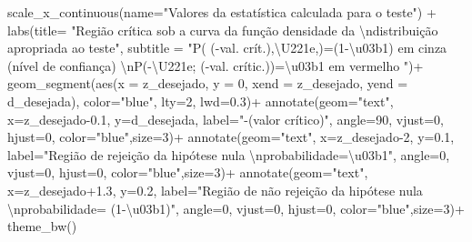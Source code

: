 \documentclass[
]{book}
\newenvironment{Shaded}{\begin{snugshade}}{\end{snugshade}}
\newcommand{\AttributeTok}[1]{\textcolor[rgb]{0.77,0.63,0.00}{#1}}
\newcommand{\DecValTok}[1]{\textcolor[rgb]{0.00,0.00,0.81}{#1}}
\newcommand{\FloatTok}[1]{\textcolor[rgb]{0.00,0.00,0.81}{#1}}
\newcommand{\FunctionTok}[1]{\textcolor[rgb]{0.00,0.00,0.00}{#1}}
\newcommand{\NormalTok}[1]{#1}
\newcommand{\SpecialCharTok}[1]{\textcolor[rgb]{0.00,0.00,0.00}{#1}}
\newcommand{\StringTok}[1]{\textcolor[rgb]{0.31,0.60,0.02}{#1}}
\begin{document}
\begin{Shaded}
\begin{Highlighting}[]
  \FunctionTok{scale\_x\_continuous}\NormalTok{(}\AttributeTok{name=}\StringTok{"Valores da estatística calculada para o teste"}\NormalTok{)  }\SpecialCharTok{+}
  \FunctionTok{labs}\NormalTok{(}\AttributeTok{title=} 
         \StringTok{"Região crítica sob a curva da função densidade da }\SpecialCharTok{\textbackslash{}n}\StringTok{distribuição apropriada ao teste"}\NormalTok{, }
       \AttributeTok{subtitle =} \StringTok{"P( ({-}val. crít.),\textbackslash{}U221e,)=(1{-}\textbackslash{}u03b1) em cinza (nível de confiança) }\SpecialCharTok{\textbackslash{}n}\StringTok{P({-}\textbackslash{}U221e; ({-}val. crític.))=\textbackslash{}u03b1 em vermelho "}\NormalTok{)}\SpecialCharTok{+}
\FunctionTok{geom\_segment}\NormalTok{(}\FunctionTok{aes}\NormalTok{(}\AttributeTok{x =}\NormalTok{ z\_desejado, }\AttributeTok{y =} \DecValTok{0}\NormalTok{, }\AttributeTok{xend =}\NormalTok{ z\_desejado, }\AttributeTok{yend =}\NormalTok{ d\_desejada), }\AttributeTok{color=}\StringTok{"blue"}\NormalTok{, }\AttributeTok{lty=}\DecValTok{2}\NormalTok{, }\AttributeTok{lwd=}\FloatTok{0.3}\NormalTok{)}\SpecialCharTok{+}
\FunctionTok{annotate}\NormalTok{(}\AttributeTok{geom=}\StringTok{"text"}\NormalTok{, }\AttributeTok{x=}\NormalTok{z\_desejado}\FloatTok{{-}0.1}\NormalTok{, }\AttributeTok{y=}\NormalTok{d\_desejada, }\AttributeTok{label=}\StringTok{"{-}(valor crítico)"}\NormalTok{, }\AttributeTok{angle=}\DecValTok{90}\NormalTok{, }\AttributeTok{vjust=}\DecValTok{0}\NormalTok{, }\AttributeTok{hjust=}\DecValTok{0}\NormalTok{, }\AttributeTok{color=}\StringTok{"blue"}\NormalTok{,}\AttributeTok{size=}\DecValTok{3}\NormalTok{)}\SpecialCharTok{+}
\FunctionTok{annotate}\NormalTok{(}\AttributeTok{geom=}\StringTok{"text"}\NormalTok{, }\AttributeTok{x=}\NormalTok{z\_desejado}\DecValTok{{-}2}\NormalTok{, }\AttributeTok{y=}\FloatTok{0.1}\NormalTok{, }\AttributeTok{label=}\StringTok{"Região de rejeição da hipótese nula }\SpecialCharTok{\textbackslash{}n}\StringTok{probabilidade=\textbackslash{}u03b1"}\NormalTok{, }\AttributeTok{angle=}\DecValTok{0}\NormalTok{, }\AttributeTok{vjust=}\DecValTok{0}\NormalTok{, }\AttributeTok{hjust=}\DecValTok{0}\NormalTok{, }\AttributeTok{color=}\StringTok{"blue"}\NormalTok{,}\AttributeTok{size=}\DecValTok{3}\NormalTok{)}\SpecialCharTok{+}
\FunctionTok{annotate}\NormalTok{(}\AttributeTok{geom=}\StringTok{"text"}\NormalTok{, }\AttributeTok{x=}\NormalTok{z\_desejado}\FloatTok{+1.3}\NormalTok{, }\AttributeTok{y=}\FloatTok{0.2}\NormalTok{, }\AttributeTok{label=}\StringTok{"Região de não rejeição da hipótese nula  }\SpecialCharTok{\textbackslash{}n}\StringTok{probabilidade= (1{-}\textbackslash{}u03b1)"}\NormalTok{, }\AttributeTok{angle=}\DecValTok{0}\NormalTok{, }\AttributeTok{vjust=}\DecValTok{0}\NormalTok{, }\AttributeTok{hjust=}\DecValTok{0}\NormalTok{, }\AttributeTok{color=}\StringTok{"blue"}\NormalTok{,}\AttributeTok{size=}\DecValTok{3}\NormalTok{)}\SpecialCharTok{+}
\FunctionTok{theme\_bw}\NormalTok{()}
\end{Highlighting}
\end{Shaded}
\end{document}
